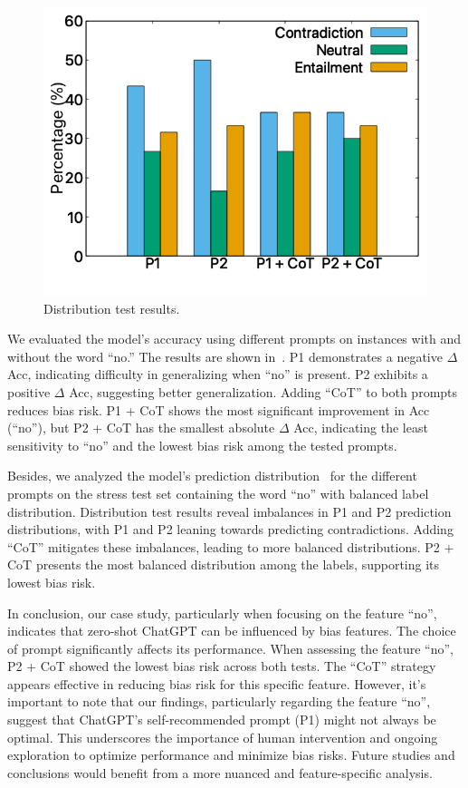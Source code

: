 \begin{figure}[th]
\centering
\includegraphics[width=0.6\columnwidth]{data/cue.png}
\caption{Distribution test results. }
\label{fig:cue_chatgpt}
\end{figure}


We evaluated the model's accuracy using different prompts on instances 
with and without the word ``no.'' The results are shown in~. 
P1 demonstrates a negative $\Delta$ Acc, 
indicating difficulty in generalizing when ``no'' is present. 
P2 exhibits a positive $\Delta$ Acc, suggesting better generalization. 
Adding ``CoT'' to both prompts reduces bias risk. 
P1 + CoT shows the most significant improvement in 
Acc (``no''), but P2 + CoT has the smallest absolute 
$\Delta$ Acc, indicating the least sensitivity to ``no'' 
and the lowest bias risk among the tested prompts.

Besides, we analyzed the model's prediction distribution~ 
for the different prompts on the stress test set 
containing the word ``no'' with balanced label distribution. 
Distribution test results reveal imbalances in P1 and P2 
prediction distributions, with P1 and P2 leaning towards 
predicting contradictions. Adding ``CoT'' mitigates these imbalances, 
leading to more balanced distributions. 
P2 + CoT presents the most balanced distribution 
among the labels, supporting its lowest bias risk.

In conclusion, our case study, particularly when focusing on the feature ``no'', indicates that zero-shot ChatGPT can be influenced by bias features. The choice of prompt significantly affects its performance. When assessing the feature ``no'', P2 + CoT showed the lowest bias risk across both tests. The ``CoT'' strategy appears effective in reducing bias risk for this specific feature. However, it's important to note that our findings, particularly regarding the feature ``no'', suggest that ChatGPT’s self-recommended prompt (P1) might not always be optimal. This underscores the importance of human intervention and ongoing exploration to optimize performance and minimize bias risks. Future studies and conclusions would benefit from a more nuanced and feature-specific analysis.

